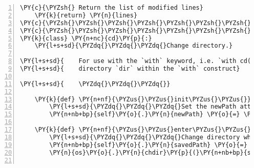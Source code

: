 \begin{Verbatim}[commandchars=\\\{\},fontsize=\small,numbers=left,firstnumber=1,stepnumber=2,firstline=2]
    \PY{c}{\PYZsh{} Return the list of modified lines}
    \PY{k}{return} \PY{n}{lines}
\PY{c}{\PYZsh{}\PYZsh{}\PYZsh{}\PYZsh{}\PYZsh{}\PYZsh{}\PYZsh{}\PYZsh{}\PYZsh{}\PYZsh{}\PYZsh{}\PYZsh{}\PYZsh{}\PYZsh{}\PYZsh{}\PYZsh{}\PYZsh{}\PYZsh{}\PYZsh{}\PYZsh{}\PYZsh{}\PYZsh{}\PYZsh{}\PYZsh{}\PYZsh{}\PYZsh{}\PYZsh{}\PYZsh{}\PYZsh{}\PYZsh{}\PYZsh{}\PYZsh{}\PYZsh{}\PYZsh{}\PYZsh{}\PYZsh{}\PYZsh{}\PYZsh{}\PYZsh{}\PYZsh{}\PYZsh{}\PYZsh{}\PYZsh{}\PYZsh{}\PYZsh{}\PYZsh{}\PYZsh{}\PYZsh{}\PYZsh{}\PYZsh{}\PYZsh{}\PYZsh{}\PYZsh{}\PYZsh{}\PYZsh{}\PYZsh{}\PYZsh{}\PYZsh{}\PYZsh{}\PYZsh{}\PYZsh{}\PYZsh{}\PYZsh{}\PYZsh{}\PYZsh{}\PYZsh{}\PYZsh{}\PYZsh{}\PYZsh{}\PYZsh{}\PYZsh{}\PYZsh{}\PYZsh{}\PYZsh{}\PYZsh{}\PYZsh{}\PYZsh{}\PYZsh{}\PYZsh{}}
\PY{c}{\PYZsh{}\PYZsh{}\PYZsh{}\PYZsh{}\PYZsh{}\PYZsh{}\PYZsh{}\PYZsh{}\PYZsh{}\PYZsh{}\PYZsh{}\PYZsh{}\PYZsh{}\PYZsh{}\PYZsh{}\PYZsh{}\PYZsh{}\PYZsh{}\PYZsh{}\PYZsh{}\PYZsh{}\PYZsh{}\PYZsh{}\PYZsh{}\PYZsh{}\PYZsh{}\PYZsh{}\PYZsh{}\PYZsh{}\PYZsh{}\PYZsh{}\PYZsh{}\PYZsh{}\PYZsh{}\PYZsh{}\PYZsh{}\PYZsh{}\PYZsh{}\PYZsh{}\PYZsh{}\PYZsh{}\PYZsh{}\PYZsh{}\PYZsh{}\PYZsh{}\PYZsh{}\PYZsh{}\PYZsh{}\PYZsh{}\PYZsh{}\PYZsh{}\PYZsh{}\PYZsh{}\PYZsh{}\PYZsh{}\PYZsh{}\PYZsh{}\PYZsh{}\PYZsh{}\PYZsh{}\PYZsh{}\PYZsh{}\PYZsh{}\PYZsh{}\PYZsh{}\PYZsh{}\PYZsh{}\PYZsh{}\PYZsh{}\PYZsh{}\PYZsh{}\PYZsh{}\PYZsh{}\PYZsh{}\PYZsh{}\PYZsh{}\PYZsh{}\PYZsh{}\PYZsh{}}
\PY{k}{class} \PY{n+nc}{cd}\PY{p}{:}
    \PY{l+s+sd}{\PYZdq{}\PYZdq{}\PYZdq{}Change directory.}

\PY{l+s+sd}{    For use with the `with` keyword, i.e. `with cd(dir):` changes to the}
\PY{l+s+sd}{    directory `dir` within the `with` construct}

\PY{l+s+sd}{    \PYZdq{}\PYZdq{}\PYZdq{}}

    \PY{k}{def} \PY{n+nf}{\PYZus{}\PYZus{}init\PYZus{}\PYZus{}}\PY{p}{(}\PY{n+nb+bp}{self}\PY{p}{,} \PY{n}{newPath}\PY{p}{)}\PY{p}{:}
        \PY{l+s+sd}{\PYZdq{}\PYZdq{}\PYZdq{}Set the newPath attribute to be the argument passed to the class.\PYZdq{}\PYZdq{}\PYZdq{}}
        \PY{n+nb+bp}{self}\PY{o}{.}\PY{n}{newPath} \PY{o}{=} \PY{n}{newPath}

    \PY{k}{def} \PY{n+nf}{\PYZus{}\PYZus{}enter\PYZus{}\PYZus{}}\PY{p}{(}\PY{n+nb+bp}{self}\PY{p}{)}\PY{p}{:}
        \PY{l+s+sd}{\PYZdq{}\PYZdq{}\PYZdq{}Change directory when the class is entered.\PYZdq{}\PYZdq{}\PYZdq{}}
        \PY{n+nb+bp}{self}\PY{o}{.}\PY{n}{savedPath} \PY{o}{=} \PY{n}{os}\PY{o}{.}\PY{n}{getcwd}\PY{p}{(}\PY{p}{)}
        \PY{n}{os}\PY{o}{.}\PY{n}{chdir}\PY{p}{(}\PY{n+nb+bp}{self}\PY{o}{.}\PY{n}{newPath}\PY{p}{)}


\end{Verbatim}
